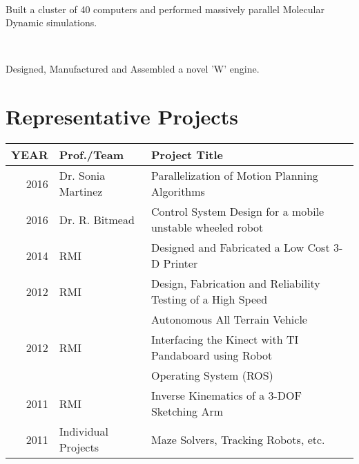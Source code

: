 \documentclass[]{deedy-resume-openfont}
\begin{document}
\begin{minipage}[t]{0.66\textwidth}
\\
\begin{tightemize}\item Built a cluster of 40 computers and performed massively parallel Molecular Dynamic simulations.
\end{tightemize}
\sectionsep


\\
\begin{tightemize}\item Designed, Manufactured and Assembled a novel 'W' engine.
\end{tightemize}
\sectionsep



\newcommand\Topstrut{\rule{0pt}{2.1ex}}
\newcommand\Bottomstrut{\rule[-0.6ex]{0pt}{0pt}}

\section{Representative Projects}
\begin{tabular}{rll}

YEAR	     & Prof./Team  & Project Title \\
\hline
2016         & Dr. Sonia Martinez & Parallelization of Motion Planning Algorithms\\
2016         &Dr. R. Bitmead & Control System Design for a mobile unstable wheeled robot\\
2014	     & RMI  & Designed and Fabricated a Low Cost 3-D Printer\\
2012	     & RMI & Design, Fabrication and Reliability Testing of a High Speed \\& & Autonomous All Terrain Vehicle\\
2012	     & RMI & Interfacing the Kinect  with TI Pandaboard using Robot \\& & Operating System (ROS)\\
2011         & RMI & Inverse Kinematics of  a 3-DOF Sketching Arm \\
2011        &  Individual Projects & Maze Solvers, Tracking Robots, etc.\\
\end{tabular}
\sectionsep



\end{minipage}
\end{document}
